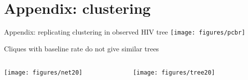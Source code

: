 \documentclass{beamer}
\begin{document}
\section{Appendix: clustering}

\begin{frame}{Appendix: replicating clustering in observed HIV tree}
  \vspace{-0.5cm}
  \texttt{[image: figures/pcbr]}
\end{frame}

\begin{frame}{Cliques with baseline rate do not give similar trees}

  \begin{columns}
    \begin{column}{0.5\textwidth}
      \texttt{[image: figures/net20]}
    \end{column}
    \begin{column}{0.5\textwidth}
      \texttt{[image: figures/tree20]}
    \end{column}
  \end{columns}
\end{frame}
\end{document}
